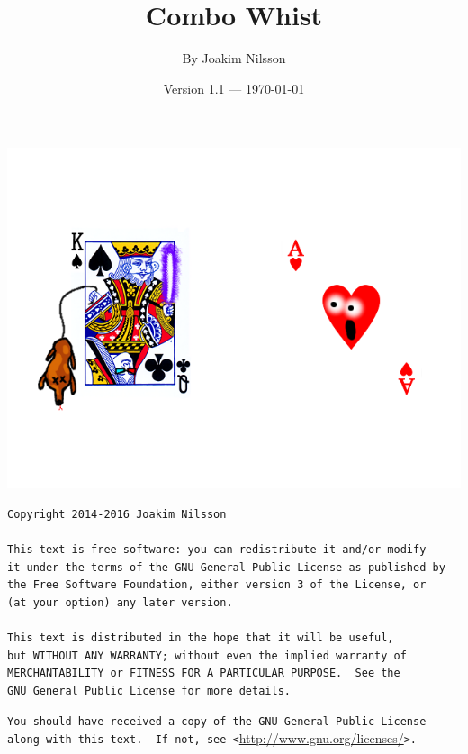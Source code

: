 \documentclass[a4paper]{article}
\title{Combo Whist}
\author{By Joakim Nilsson}
\date{Version 1.1 --- \today}
\begin{document}
	\maketitle

	\begin{center}
		\includegraphics[width = \textwidth]{logo.png}
	\end{center}

	\vfill

\begin{verbatim}
Copyright 2014-2016 Joakim Nilsson

This text is free software: you can redistribute it and/or modify
it under the terms of the GNU General Public License as published by
the Free Software Foundation, either version 3 of the License, or
(at your option) any later version.

This text is distributed in the hope that it will be useful,
but WITHOUT ANY WARRANTY; without even the implied warranty of
MERCHANTABILITY or FITNESS FOR A PARTICULAR PURPOSE.  See the
GNU General Public License for more details.
\end{verbatim}

	\verb|You should have received a copy of the GNU General Public License|\\
	\verb|along with this text.  If not, see <|\url{http://www.gnu.org/licenses/}\verb|>.|

	\thispagestyle{empty}
	\pagebreak

	\setcounter{tocdepth}{3}
	\tableofcontents
	\listoftables
	\thispagestyle{empty}
	\pagebreak
\end{document}

